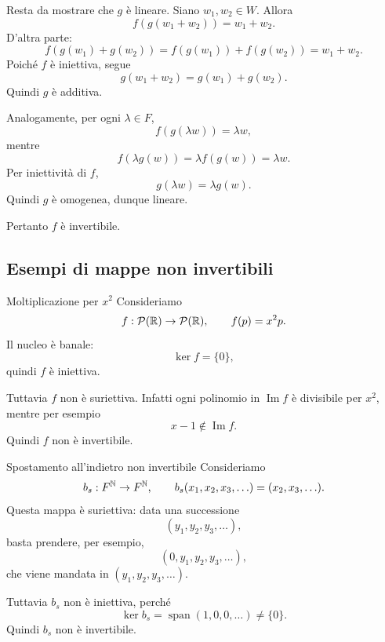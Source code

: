 \documentclass[a4paper]{article}
\begin{document}
\begin{snippetproof}{}
\begin{iffproof}
        Resta da mostrare che \(g\) è lineare. Siano \(w_1,w_2\in W\). Allora
        \[
            f(g(w_1+w_2))=w_1+w_2.
        \]
        D'altra parte:
        \[
            f(g(w_1)+g(w_2))
            =
            f(g(w_1))+f(g(w_2))
            =
            w_1+w_2.
        \]
        Poiché \(f\) è iniettiva, segue
        \[
            g(w_1+w_2)=g(w_1)+g(w_2).
        \]
        Quindi \(g\) è additiva.

        Analogamente, per ogni \(\lambda\in F\),
        \[
            f(g(\lambda w))=\lambda w,
        \]
        mentre
        \[
            f(\lambda g(w))
            =
            \lambda f(g(w))
            =
            \lambda w.
        \]
        Per iniettività di \(f\),
        \[
            g(\lambda w)=\lambda g(w).
        \]
        Quindi \(g\) è omogenea, dunque lineare.

        Pertanto \(f\) è invertibile.
    \end{iffproof}
\end{snippetproof}

\subsection{Esempi di mappe non invertibili}

\begin{snippetexample}{Moltiplicazione per \(x^2\)}
    Consideriamo
    \[
        f:\mathcal{P}(\mathbb{R})\to\mathcal{P}(\mathbb{R}),
        \qquad
        f(p)=x^2p.
    \]
    Il nucleo è banale:
    \[
        \ker f=\{0\},
    \]
    quindi \(f\) è iniettiva.

    Tuttavia \(f\) non è suriettiva. Infatti ogni polinomio in \(\operatorname{Im}f\) è divisibile per \(x^2\), mentre per esempio
    \[
        x-1\notin\operatorname{Im}f.
    \]
    Quindi \(f\) non è invertibile.
\end{snippetexample}

\begin{snippetexample}{Spostamento all'indietro non invertibile}
    Consideriamo
    \[
        b_s:F^{\mathbb{N}}\to F^{\mathbb{N}},
        \qquad
        b_s(x_1,x_2,x_3,\ldots)=(x_2,x_3,\ldots).
    \]
    Questa mappa è suriettiva: data una successione
    \[
        (y_1,y_2,y_3,\ldots),
    \]
    basta prendere, per esempio,
    \[
        (0,y_1,y_2,y_3,\ldots),
    \]
    che viene mandata in \((y_1,y_2,y_3,\ldots)\).

    Tuttavia \(b_s\) non è iniettiva, perché
    \[
        \ker b_s
        =
        \operatorname{span}(1,0,0,\ldots)\neq\{0\}.
    \]
    Quindi \(b_s\) non è invertibile.
\end{snippetexample}
\end{document}
